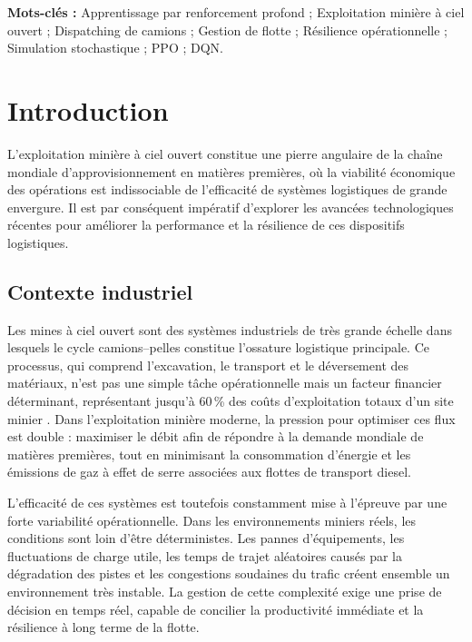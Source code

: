 \documentclass[11pt,a4paper]{article}
\begin{document}
\noindent\textbf{Mots-clés :} Apprentissage par renforcement profond ; Exploitation minière à ciel ouvert ; Dispatching de camions ; Gestion de flotte ; Résilience opérationnelle ; Simulation stochastique ; PPO ; DQN.

\section{Introduction}
\label{sec:intro}

L'exploitation minière à ciel ouvert constitue une pierre angulaire de la chaîne mondiale d'approvisionnement en matières premières, où la viabilité économique des opérations est indissociable de l'efficacité de systèmes logistiques de grande envergure. Il est par conséquent impératif d'explorer les avancées technologiques récentes pour améliorer la performance et la résilience de ces dispositifs logistiques.

\subsection{Contexte industriel}

Les mines à ciel ouvert sont des systèmes industriels de très grande échelle dans lesquels le cycle camions--pelles constitue l'ossature logistique principale. Ce processus, qui comprend l'excavation, le transport et le déversement des matériaux, n'est pas une simple tâche opérationnelle mais un facteur financier déterminant, représentant jusqu'à 60\,\% des coûts d'exploitation totaux d'un site minier \cite{Afrapoli2017}. Dans l'exploitation minière moderne, la pression pour optimiser ces flux est double : maximiser le débit afin de répondre à la demande mondiale de matières premières, tout en minimisant la consommation d'énergie et les émissions de gaz à effet de serre associées aux flottes de transport diesel.

L'efficacité de ces systèmes est toutefois constamment mise à l'épreuve par une forte variabilité opérationnelle. Dans les environnements miniers réels, les conditions sont loin d'être déterministes. Les pannes d'équipements, les fluctuations de charge utile, les temps de trajet aléatoires causés par la dégradation des pistes et les congestions soudaines du trafic créent ensemble un environnement très instable. La gestion de cette complexité exige une prise de décision en temps réel, capable de concilier la productivité immédiate et la résilience à long terme de la flotte.
\end{document}
